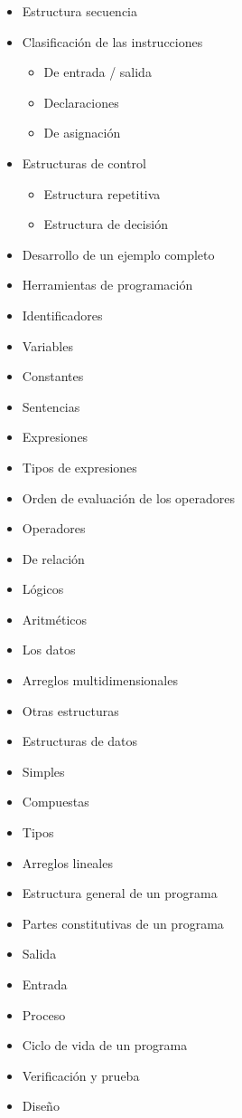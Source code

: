 \begin{itemize}
\item Estructura secuencia
\item Clasificación de las instrucciones
		\begin{itemize}
			\item De entrada / salida
			\item Declaraciones
			\item De asignación
		\end{itemize}
\item Estructuras de control
	\begin{itemize}
	\item Estructura repetitiva
	\item Estructura de decisión 
	\end{itemize}
\item Desarrollo de un ejemplo completo
\item Herramientas de programación
\item Identificadores
\item Variables
\item Constantes
\item Sentencias
\item Expresiones
\item Tipos de expresiones
\item Orden de evaluación de los operadores
\item Operadores
\item De relación
\item Lógicos
\item Aritméticos
\item Los datos
\item Arreglos multidimensionales
\item Otras estructuras
\item Estructuras de datos
\item Simples
\item Compuestas
\item Tipos
\item Arreglos lineales
\item Estructura general de un programa
\item Partes constitutivas de un programa
\item Salida
\item Entrada
\item Proceso
\item Ciclo de vida de un programa
\item Verificación y prueba
\item Diseño

\end{itemize}
